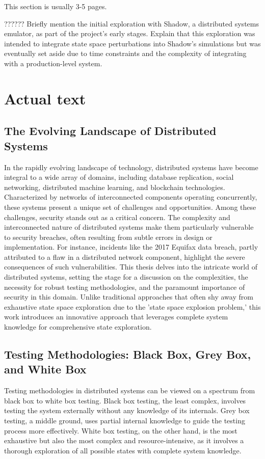 \documentclass[a4paper,11pt,oneside]{report}
\begin{document}
This section is usually 3-5 pages.

??????
Briefly mention the initial exploration with Shadow, a distributed systems emulator, as part of the project's early stages. Explain that this exploration was intended to integrate state space perturbations into Shadow's simulations but was eventually set aside due to time constraints and the complexity of integrating with a production-level system.

\section{Actual text}

\subsection{The Evolving Landscape of Distributed Systems}
In the rapidly evolving landscape of technology, distributed systems have become integral to a wide array of domains, including database replication, social networking, distributed machine learning, and blockchain technologies. Characterized by networks of interconnected components operating concurrently, these systems present a unique set of challenges and opportunities. Among these challenges, security stands out as a critical concern. The complexity and interconnected nature of distributed systems make them particularly vulnerable to security breaches, often resulting from subtle errors in design or implementation. For instance, incidents like the 2017 Equifax data breach, partly attributed to a flaw in a distributed network component, highlight the severe consequences of such vulnerabilities. This thesis delves into the intricate world of distributed systems, setting the stage for a discussion on the complexities, the necessity for robust testing methodologies, and the paramount importance of security in this domain. Unlike traditional approaches that often shy away from exhaustive state space exploration due to the 'state space explosion problem,' this work introduces an innovative approach that leverages complete system knowledge for comprehensive state exploration.

\subsection{Testing Methodologies: Black Box, Grey Box, and White Box}
Testing methodologies in distributed systems can be viewed on a spectrum from black box to white box testing. Black box testing, the least complex, involves testing the system externally without any knowledge of its internals. Grey box testing, a middle ground, uses partial internal knowledge to guide the testing process more effectively. White box testing, on the other hand, is the most exhaustive but also the most complex and resource-intensive, as it involves a thorough exploration of all possible states with complete system knowledge.
\end{document}

